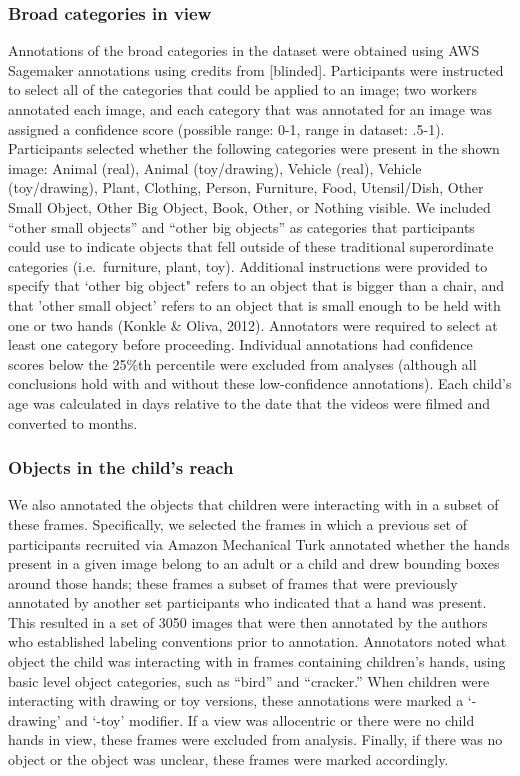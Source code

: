 \documentclass[10pt, letterpaper]{article}
\begin{document}
\hypertarget{broad-categories-in-view}{%
\subsubsection{Broad categories in
view}\label{broad-categories-in-view}}

Annotations of the broad categories in the dataset were obtained using
AWS Sagemaker annotations using credits from {[}blinded{]}. Participants
were instructed to select all of the categories that could be applied to
an image; two workers annotated each image, and each category that was
annotated for an image was assigned a confidence score (possible range:
0-1, range in dataset: .5-1). Participants selected whether the
following categories were present in the shown image: Animal (real),
Animal (toy/drawing), Vehicle (real), Vehicle (toy/drawing), Plant,
Clothing, Person, Furniture, Food, Utensil/Dish, Other Small Object,
Other Big Object, Book, Other, or Nothing visible. We included ``other
small objects'' and ``other big objects'' as categories that
participants could use to indicate objects that fell outside of these
traditional superordinate categories (i.e.~furniture, plant, toy).
Additional instructions were provided to specify that `other big object"
refers to an object that is bigger than a chair, and that 'other small
object' refers to an object that is small enough to be held with one or
two hands (Konkle \& Oliva, 2012). Annotators were required to select at
least one category before proceeding. Individual annotations had
confidence scores below the 25\%th percentile were excluded from
analyses (although all conclusions hold with and without these
low-confidence annotations). Each child's age was calculated in days
relative to the date that the videos were filmed and converted to
months.

\hypertarget{objects-in-the-childs-reach}{%
\subsubsection{Objects in the child's
reach}\label{objects-in-the-childs-reach}}

We also annotated the objects that children were interacting with in a
subset of these frames. Specifically, we selected the frames in which a
previous set of participants recruited via Amazon Mechanical Turk
annotated whether the hands present in a given image belong to an adult
or a child and drew bounding boxes around those hands; these frames a
subset of frames that were previously annotated by another set
participants who indicated that a hand was present. This resulted in a
set of 3050 images that were then annotated by the authors who
established labeling conventions prior to annotation. Annotators noted
what object the child was interacting with in frames containing
children's hands, using basic level object categories, such as ``bird''
and ``cracker.'' When children were interacting with drawing or toy
versions, these annotations were marked a `-drawing' and `-toy'
modifier. If a view was allocentric or there were no child hands in
view, these frames were excluded from analysis. Finally, if there was no
object or the object was unclear, these frames were marked accordingly.
\end{document}
